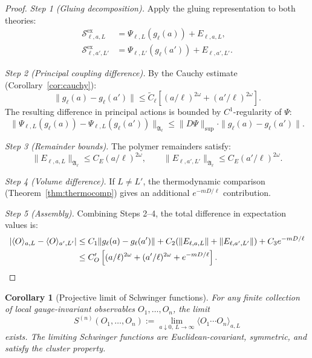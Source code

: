 \documentclass[12pt]{article}
\theoremstyle{plain}
\newtheorem{corollary}[theorem]{Corollary}
\theoremstyle{definition}
\numberwithin{equation}{section}
\newcommand{\fA}{\mathfrak{A}}
\newcommand{\ex}{\mathrm{ex}}
\begin{document}
\begin{proof}
\emph{Step 1 (Gluing decomposition).}  Apply the gluing representation to both theories:
\begin{align}
\mathcal{S}^{\ex}_{\ell,a,L} &= \Psi_{\ell,L}(g_\ell(a))+E_{\ell,a,L},\\
\mathcal{S}^{\ex}_{\ell,a',L'} &= \Psi_{\ell,L'}(g_\ell(a'))+E_{\ell,a',L'}.
\end{align}

\emph{Step 2 (Principal coupling difference).}  By the Cauchy estimate (Corollary~\ref{cor:cauchy}):
\begin{equation}
\|g_\ell(a)-g_\ell(a')\| \leq \widetilde{C}_\ell\left[(a/\ell)^{2\omega}+(a'/\ell)^{2\omega}\right].
\end{equation}
The resulting difference in principal actions is bounded by $C^1$-regularity of $\Psi$:
\begin{equation}
\|\Psi_{\ell,L}(g_\ell(a))-\Psi_{\ell,L}(g_\ell(a'))\|_{\fA_\ell} \leq \|D\Psi\|_{\sup}\cdot\|g_\ell(a)-g_\ell(a')\|.
\end{equation}

\emph{Step 3 (Remainder bounds).}  The polymer remainders satisfy:
\begin{equation}
\|E_{\ell,a,L}\|_{\fA_\ell}\leq C_E(a/\ell)^{2\omega},\qquad \|E_{\ell,a',L'}\|_{\fA_\ell}\leq C_E(a'/\ell)^{2\omega}.
\end{equation}

\emph{Step 4 (Volume difference).}  If $L\neq L'$, the thermodynamic comparison (Theorem~\ref{thm:thermocomp}) gives an additional $e^{-mD/\ell}$ contribution.

\emph{Step 5 (Assembly).}  Combining Steps 2--4, the total difference in expectation values is:
\begin{align}
|\langle O\rangle_{a,L}-\langle O\rangle_{a',L'}| &\leq C_1\|g_\ell(a)-g_\ell(a')\|+C_2(\|E_{\ell,a,L}\|+\|E_{\ell,a',L'}\|)+C_3 e^{-mD/\ell}\\
&\leq C_O'\left[(a/\ell)^{2\omega}+(a'/\ell)^{2\omega}+e^{-mD/\ell}\right].\qedhere
\end{align}
\end{proof}

\begin{corollary}[Projective limit of Schwinger functions]\label{cor:schwingerlimit}
For any finite collection of local gauge-invariant observables $O_1,\ldots,O_n$, the limit
\begin{equation}
S^{(n)}(O_1,\ldots,O_n) := \lim_{a\downarrow 0,\,L\to\infty}\langle O_1\cdots O_n\rangle_{a,L}
\end{equation}
exists.  The limiting Schwinger functions are Euclidean-covariant, symmetric, and satisfy the cluster property.
\end{corollary}
\end{document}
